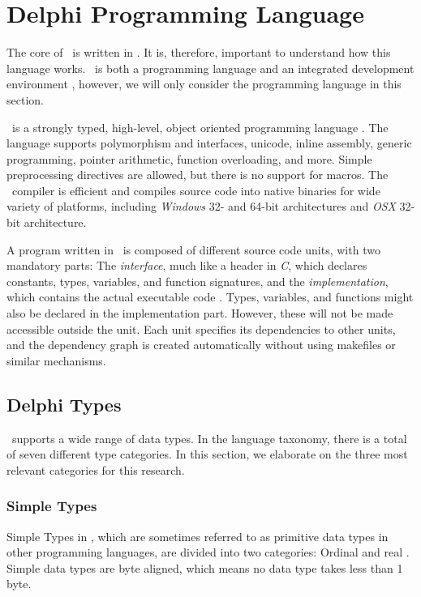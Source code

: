 \section{Delphi Programming Language}
\label{sec:Delphi Programming Language}
The core of \gap~is written in \delphi. It is, therefore, important to understand how this language works. \delphi~is both a programming language and an integrated development environment \cite{Wikipedia_contributors2016-jk}, however, we will only consider the programming language in this section.

\delphi~is a strongly typed, high-level, object oriented programming language \cite{noauthor_undated-cn, Wikipedia_contributors2016-jk}. The language supports polymorphism and interfaces, unicode, inline assembly, generic programming, pointer arithmetic, function overloading, and more. Simple preprocessing directives are allowed, but there is no support for macros. The \delphi~compiler is efficient and compiles source code into native binaries for wide variety of platforms, including \textit{Windows} 32- and 64-bit architectures and \textit{OSX} 32-bit architecture.

A program written in \delphi~is composed of different source code units, with two mandatory parts: The \textit{interface}, much like a header in \textit{C}, which declares constants, types, variables, and function signatures, and the \textit{implementation}, which contains the actual executable code \cite{noauthor_undated-pl}. Types, variables, and functions might also be declared in the implementation part. However, these will not be made accessible outside the unit. Each unit specifies its dependencies to other units, and the dependency graph is created automatically without using makefiles or similar mechanisms.

\subsection{Delphi Types}
\label{sub:Delphi Types}
\delphi~supports a wide range of data types. In the language taxonomy, there is a total of seven different type categories. In this section, we elaborate on the three most relevant categories for this research.

\subsubsection{Simple Types}
\label{ssub:Simple Types}
Simple Types in \delphi, which are sometimes referred to as primitive data types in other programming languages, are divided into two categories: Ordinal and real \cite{noauthor_undated-st}. Simple data types are byte aligned, which means no data type takes less than 1 byte.

